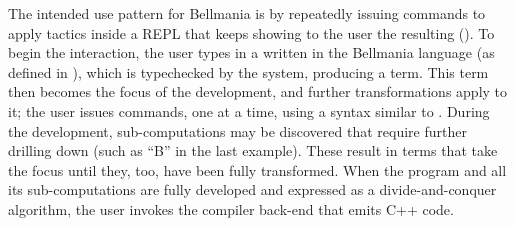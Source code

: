 The intended use pattern for Bellmania is by repeatedly issuing
commands to apply tactics inside a REPL that keeps showing to the
user the resulting  ().
To begin the interaction, the user types in a  written
in the Bellmania language (as defined in ), which is typechecked
by the system, producing a term.
This term then becomes the focus of the development, and further transformations
apply to it; the user issues  commands, one at a time,
using a syntax similar to .
During the development, sub-computations may be discovered that require
further drilling down (such as ``B'' in the last example).
These result in  terms that take the focus until they, too,
have been fully transformed.
When the program and all its sub-computations are fully developed and
expressed as a divide-and-conquer algorithm, the user invokes the compiler
back-end that emits C++ code.


